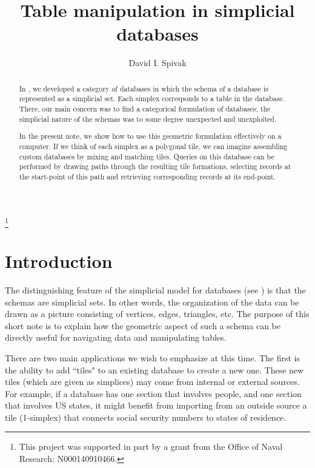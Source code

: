 \documentclass{amsart}
\theoremstyle{remark}
\theoremstyle{definition}
\begin{document}
\title{Table manipulation in simplicial databases}

\author{David I. Spivak}

\thanks{This project was supported in part by a grant from the Office of Naval Research: N000140910466.}

\begin{abstract}

In \cite{Spi}, we developed a category of databases in which the schema of a database is represented as a simplicial set.  Each simplex corresponds to a table in the database.  There, our main concern was to find a categorical formulation of databases; the simplicial nature of the schemas was to some degree unexpected and unexploited.

In the present note, we show how to use this geometric formulation effectively on a computer.  If we think of each simplex as a polygonal tile, we can imagine assembling custom databases by mixing and matching tiles.  Queries on this database can be performed by drawing paths through the resulting tile formations, selecting records at the start-point of this path and retrieving corresponding records at its end-point.  

\end{abstract}

\maketitle

\tableofcontents

\section{Introduction}

The distinguishing feature of the simplicial model for databases (see \cite{Spi}) is that the schemas are simplicial sets.  In other words, the organization of the data can be drawn as a picture consisting of vertices, edges, triangles, etc.  The purpose of this short note is to explain how the geometric aspect of such a schema can be directly useful for navigating data and manipulating tables.

There are two main applications we wish to emphasize at this time.  The first is the ability to add ``tiles" to an existing database to create a new one.  These new tiles (which are given as simplices) may come from internal or external sources.  For example, if a database has one section that involves people, and one section that involves US states, it might benefit from importing from an outside source a tile (1-simplex) that connects social security numbers to states of residence.  
\end{document}
